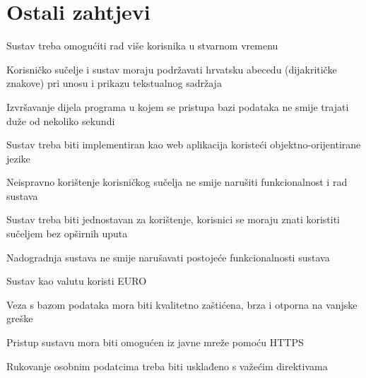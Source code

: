 		\section{Ostali zahtjevi}
		\begin{packed_item}
		    \item Sustav treba omogućiti rad više korisnika u stvarnom vremenu
			\item Korisničko sučelje i sustav moraju podržavati hrvatsku abecedu (dijakritičke znakove) pri unosu i prikazu tekstualnog sadržaja
			\item Izvršavanje dijela programa u kojem se pristupa bazi podataka ne smije trajati duže od nekoliko sekundi
			\item Sustav treba biti implementiran kao web aplikacija koristeći objektno-orijentirane jezike
			\item Neispravno korištenje korisničkog sučelja ne smije narušiti funkcionalnost i rad sustava
			\item Sustav treba biti jednostavan za korištenje, korisnici se moraju znati koristiti sučeljem bez opširnih uputa
			\item Nadogradnja sustava ne smije narušavati postojeće funkcionalnosti sustava
			\item Sustav kao valutu koristi EURO
			\item Veza s bazom podataka mora biti kvalitetno zaštićena, brza i otporna na vanjske greške
			\item Pristup sustavu mora biti omogućen iz javne mreže pomoću HTTPS
			\item Rukovanje osobnim podatcima treba biti usklađeno s važećim direktivama
			
		\end{packed_item}